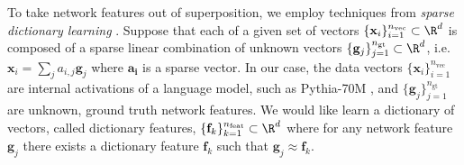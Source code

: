 \label{section:sparse_autoencoder}
To take network features out of superposition, we employ techniques from \emph{sparse dictionary learning} \citep{olshausen1997sparse, lee2006efficient}. Suppose that each of a given set of vectors $\{\mathbf{x}_i\}_{i=1}^{n_{\text{vec}}} \subset \R^d$ is composed of a sparse linear combination of unknown vectors $\{\mathbf{g}_j\}_{j=1}^{n_{\text{gt}}} \subset \R^d$, i.e. $\mathbf{x}_i = \sum_j a_{i,j}\mathbf{g}_j$ where $\mathbf{a_i}$ is a sparse vector. In our case, the data vectors $\{\mathbf{x}_i\}_{i=1}^{n_{\text{vec}}}$ are internal activations of a language model, such as Pythia-70M \citep{biderman2023pythia}, and $\{\mathbf{g}_j\}_{j=1}^{n_{\text{gt}}}$ are unknown, ground truth network features. We would like learn a dictionary of vectors, called dictionary features, $\{\mathbf{f}_k\}_{k=1}^{n_{\text{feat}}} \subset \R^d$ where for any network feature $\mathbf{g}_j$ there exists a dictionary feature $\mathbf{f}_k$ such that $\mathbf{g}_j \approx \mathbf{f}_k$. 

